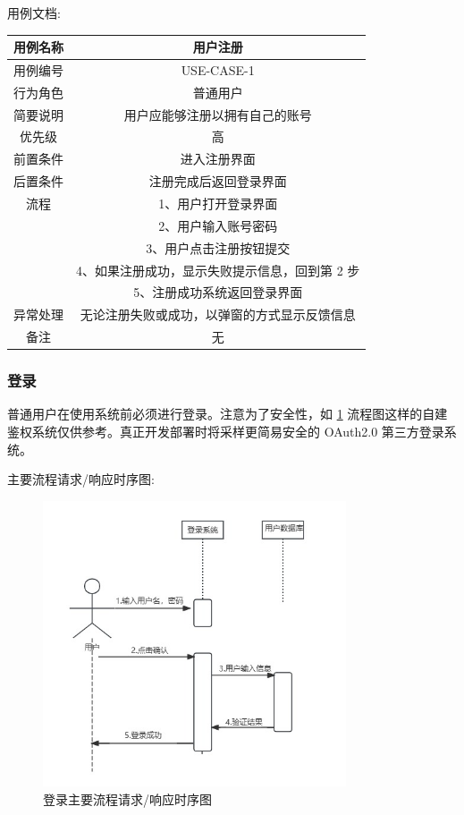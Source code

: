 \documentclass[12pt]{ctexart} %
\begin{document}
用例文档:

\begin{tabular}{|c|c|}
  \hline
  用例名称& 用户注册\\
  \hline
  用例编号 & USE-CASE-1\\
  \hline
  行为角色 & 普通用户\\
  \hline
  简要说明 & 用户应能够注册以拥有自己的账号\\
  \hline
  优先级 & 高\\
  \hline
  前置条件 & 进入注册界面\\
  \hline
  后置条件 & 注册完成后返回登录界面\\
  \hline
  流程 & 1、用户打开登录界面\\
      & 2、用户输入账号密码\\
      & 3、用户点击注册按钮提交\\
      & 4、如果注册成功，显示失败提示信息，回到第 2 步\\
      & 5、注册成功系统返回登录界面\\
  \hline
  异常处理 & 无论注册失败或成功，以弹窗的方式显示反馈信息\\
  \hline
  备注 & 无\\
  \hline
\end{tabular}

\subsubsection{登录}
普通用户在使用系统前必须进行登录。注意为了安全性，如 \ref{fig:login-sequence} 流程图这样的自建鉴权系统仅供参考。真正开发部署时将采样更简易安全的 OAuth2.0 第三方登录系统。

主要流程请求/响应时序图:

\begin{figure}[ht]
  \centering
  \includegraphics[width=0.8\textwidth]{yongli2.jpg}
  \caption{登录主要流程请求/响应时序图}
  \label{fig:login-sequence} %
\end{figure}
\end{document}

